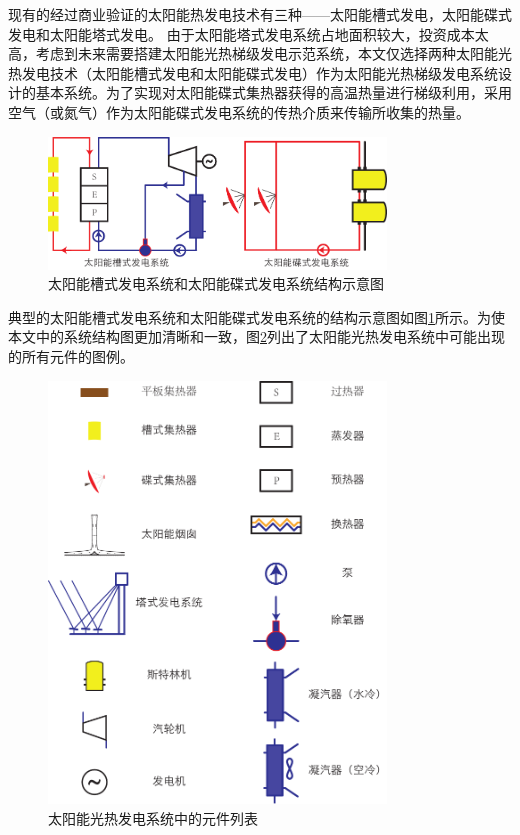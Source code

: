 现有的经过商业验证的太阳能热发电技术有三种——太阳能槽式发电，太阳能碟式发电和太阳能塔式发电。
由于太阳能塔式发电系统占地面积较大，投资成本太高，考虑到未来需要搭建太阳能光热梯级发电示范系统，本文仅选择两种太阳能光热发电技术（太阳能槽式发电和太阳能碟式发电）作为太阳能光热梯级发电系统设计的基本系统。为了实现对太阳能碟式集热器获得的高温热量进行梯级利用，采用空气（或氮气）作为太阳能碟式发电系统的传热介质来传输所收集的热量。
\begin{figure}[!ht]
\centering
\includegraphics[width=0.8\textwidth]{fig/PTPD.pdf}
\caption{太阳能槽式发电系统和太阳能碟式发电系统结构示意图}
\label{fig:PTPD}
\end{figure}
典型的太阳能槽式发电系统和太阳能碟式发电系统的结构示意图如图\ref{fig:PTPD}所示。为使本文中的系统结构图更加清晰和一致，图\ref{fig:Legends}列出了太阳能光热发电系统中可能出现的所有元件的图例。
\begin{figure}[!ht]
\centering
\includegraphics[width=0.8\textwidth]{fig/Legends.pdf}
\caption{太阳能光热发电系统中的元件列表}
\label{fig:Legends}
\end{figure}


